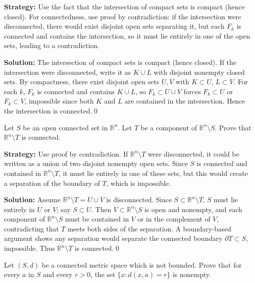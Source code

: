 \noindent\textbf{Strategy:} Use the fact that the intersection of compact sets is compact (hence closed). For connectedness, use proof by contradiction: if the intersection were disconnected, there would exist disjoint open sets separating it, but each $F_k$ is connected and contains the intersection, so it must lie entirely in one of the open sets, leading to a contradiction.

\bigskip\noindent\textbf{Solution:}
The intersection of compact sets is compact (hence closed). If the intersection were disconnected, write it as $K\cup L$ with disjoint nonempty closed sets. By compactness, there exist disjoint open sets $U,V$ with $K\subset U$, $L\subset V$. For each $k$, $F_k$ is connected and contains $K\cup L$, so $F_k\subset U\cup V$ forces $F_k\subset U$ or $F_k\subset V$, impossible since both $K$ and $L$ are contained in the intersection. Hence the intersection is connected.\qed



\begin{problembox}
Let $S$ be an open connected set in $\mathbb{R}^n$. Let $T$ be a component of $\mathbb{R}^n \setminus S$. Prove that $\mathbb{R}^n \setminus T$ is connected.
\end{problembox}

\noindent\textbf{Strategy:} Use proof by contradiction. If $\mathbb{R}^n \setminus T$ were disconnected, it could be written as a union of two disjoint nonempty open sets. Since $S$ is connected and contained in $\mathbb{R}^n \setminus T$, it must lie entirely in one of these sets, but this would create a separation of the boundary of $T$, which is impossible.

\bigskip\noindent\textbf{Solution:}
Assume $\mathbb{R}^n\setminus T=U\cup V$ is disconnected. Since $S\subset\mathbb{R}^n\setminus T$, $S$ must lie entirely in $U$ or $V$; say $S\subset U$. Then $V\subset \mathbb{R}^n\setminus S$ is open and nonempty, and each component of $\mathbb{R}^n\setminus S$ must be contained in $V$ or in the complement of $V$, contradicting that $T$ meets both sides of the separation. A boundary-based argument shows any separation would separate the connected boundary $\partial T\subset S$, impossible. Thus $\mathbb{R}^n\setminus T$ is connected.\qed



\begin{problembox}
Let $(S, d)$ be a connected metric space which is not bounded. Prove that for every $a$ in $S$ and every $r > 0$, the set $\{x : d(x, a) = r\}$ is nonempty.
\end{problembox}

